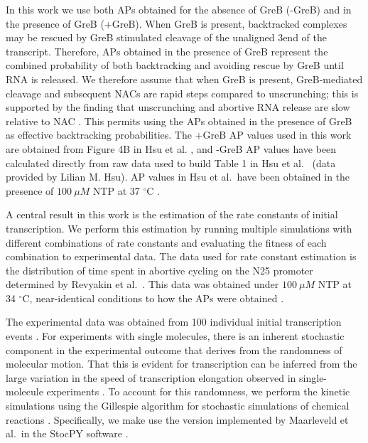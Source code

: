 In this work we use both APs obtained for the absence of GreB (-GreB) and in
the presence of GreB (+GreB). When GreB is present, backtracked complexes may
be rescued by GreB stimulated cleavage of the unaligned 3\ppp end of the
transcript. Therefore, APs obtained in the presence of GreB represent the
combined probability of both backtracking and avoiding rescue by GreB until
RNA is released. We therefore assume that when GreB is present, GreB-mediated
cleavage and subsequent NACs are rapid steps compared to unscrunching; this is
supported by the finding that unscrunching and abortive RNA release are slow
relative to NAC \cite{revyakin_abortive_2006, margeat_direct_2006}. This
permits using the APs obtained in the presence of GreB as effective
backtracking probabilities. The +GreB AP values used in this work are obtained
from Figure 4B in Hsu et al. \cite{hsu_initial_2006}, and -GreB AP values have
been calculated directly from raw data used to build Table 1 in Hsu et al.\
\cite{hsu_initial_2006} (data provided by Lilian M. Hsu). AP values in Hsu et
al.\ have been obtained in the presence of $100\ \mu M$ NTP at 37 $^{\circ}$C
\cite{hsu_initial_2006}.

A central result in this work is the estimation of the rate constants of initial
transcription. We perform this estimation by running multiple simulations with
different combinations of rate constants and evaluating the fitness of each
combination to experimental data. The data used for rate constant estimation
is the distribution of time spent in abortive cycling on the N25 promoter
determined by Revyakin et al.\ \cite{revyakin_abortive_2006}. This data was
obtained under $100\ \mu M$ NTP at 34 $^{\circ}$C, near-identical conditions
to how the APs were obtained \cite{hsu_initial_2006}.

The experimental data was obtained from 100 individual initial transcription
events \cite{revyakin_abortive_2006}. For experiments with single molecules,
there is an inherent stochastic component in the experimental outcome that
derives from the randomness of molecular motion. That this is evident for
transcription can be inferred from the large variation in the speed of
transcription elongation observed in single-molecule experiments
\cite{adelman_single_2002, tolic-norrelykke_diversity_2004}. To account for
this randomness, we perform the kinetic simulations using the Gillespie
algorithm for stochastic simulations of chemical reactions
\cite{gillespie_exact_1977}. Specifically, we make use the version implemented
by Maarleveld et al.\ in the StocPY software \cite{maarleveld_stochpy:_2013}.

